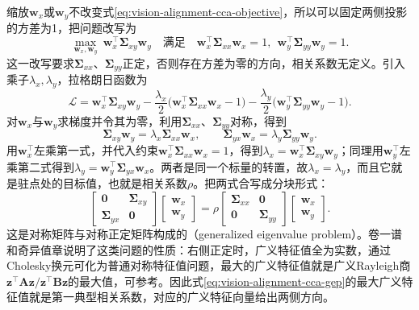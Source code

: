 缩放$\bm w_x$或$\bm w_y$不改变式\eqref{eq:vision-alignment-cca-objective}，所以可以固定两侧投影的方差为1，把问题改写为
\[
  \max_{\bm w_x,\bm w_y}\ \bm w_x^\top\bm\Sigma_{xy}\bm w_y
  \quad\text{满足}\quad
  \bm w_x^\top\bm\Sigma_{xx}\bm w_x=1,\ \
  \bm w_y^\top\bm\Sigma_{yy}\bm w_y=1.
\]
这一改写要求$\bm\Sigma_{xx}$、$\bm\Sigma_{yy}$正定，否则存在方差为零的方向，相关系数无定义。引入乘子$\lambda_x,\lambda_y$，拉格朗日函数为
\[
  \mathcal L=\bm w_x^\top\bm\Sigma_{xy}\bm w_y
   -\frac{\lambda_x}{2}\bigl(\bm w_x^\top\bm\Sigma_{xx}\bm w_x-1\bigr)
   -\frac{\lambda_y}{2}\bigl(\bm w_y^\top\bm\Sigma_{yy}\bm w_y-1\bigr).
\]
对$\bm w_x$与$\bm w_y$求梯度并令其为零，利用$\bm\Sigma_{xx}$、$\bm\Sigma_{yy}$对称，得到
\begin{equation}
  \bm\Sigma_{xy}\bm w_y=\lambda_x\bm\Sigma_{xx}\bm w_x,\qquad
  \bm\Sigma_{yx}\bm w_x=\lambda_y\bm\Sigma_{yy}\bm w_y.
  \label{eq:vision-alignment-cca-stationary}
\end{equation}
用$\bm w_x^\top$左乘第一式，并代入约束$\bm w_x^\top\bm\Sigma_{xx}\bm w_x=1$，得到$\lambda_x=\bm w_x^\top\bm\Sigma_{xy}\bm w_y$；同理用$\bm w_y^\top$左乘第二式得到$\lambda_y=\bm w_y^\top\bm\Sigma_{yx}\bm w_x$。两者是同一个标量的转置，故$\lambda_x=\lambda_y$，而且它就是驻点处的目标值，也就是相关系数$\rho$。把两式合写成分块形式：
\begin{equation}
  \begin{bmatrix}\bm 0&\bm\Sigma_{xy}\\ \bm\Sigma_{yx}&\bm 0\end{bmatrix}
  \begin{bmatrix}\bm w_x\\ \bm w_y\end{bmatrix}
  =\rho
  \begin{bmatrix}\bm\Sigma_{xx}&\bm 0\\ \bm 0&\bm\Sigma_{yy}\end{bmatrix}
  \begin{bmatrix}\bm w_x\\ \bm w_y\end{bmatrix}.
  \label{eq:vision-alignment-cca-gep}
\end{equation}
这是对称矩阵与对称正定矩阵构成的（generalized eigenvalue problem）。卷一谱和奇异值章说明了这类问题的性质：右侧正定时，广义特征值全为实数，通过Cholesky换元可化为普通对称特征值问题，最大的广义特征值就是广义Rayleigh商$\bm z^\top\bm A\bm z/\bm z^\top\bm B\bm z$的最大值，可参考。因此式\eqref{eq:vision-alignment-cca-gep}的最大广义特征值就是第一典型相关系数，对应的广义特征向量给出两侧方向。

